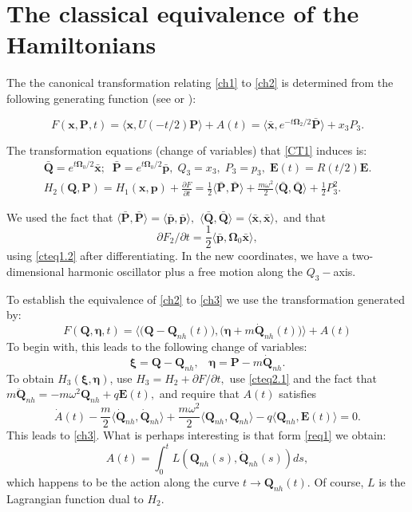\documentclass[12pt]{article}
\numberwithin{equation}{section}
\newcommand{\bxi}{{\boldsymbol \xi}}
\newcommand{\bet}{{\boldsymbol \eta}}
\newcommand{\bOm}{{\boldsymbol \Omega}}
\def\bp{{\boldsymbol p}}
\def\bP{{\boldsymbol P}}
\def\bE{{\boldsymbol E}}
\def\bQ{{\boldsymbol Q}}
\def\bx{{\boldsymbol x}}
\begin{document}
\section{The classical equivalence of the Hamiltonians}
The the canonical transformation relating \eqref{ch1} to \eqref{ch2} is determined from the following generating function (see \cite{A} or \cite{G}):

\begin{equation}\label{CT1}
F(\bx,\bP,t) = \langle\bx,U(-t/2)\bP\rangle + A(t) = \langle\bar{\bx},e^{-t\bOm_2/2}\bar{\bP}\rangle +x_3P_3.
\end{equation}	

The transformation equations (change of variables) that \eqref{CT1} induces is:
\begin{gather}
\bar{\bQ} = e^{t\bOm_0/2}\bar{\bx};\;\;\bar{\bP}=e^{t\bOm_0/2}\bar{\bp}, \;Q_3=x_3, \;P_3=p_3, \;\bE(t)=R(t/2)\bE. \label{cteq1.1} \\
H_2(\bQ,\bP)  = H_1(\bx,\bp) + \frac{\partial F}{\partial t} = \frac{1}{2}\langle\bar{\bP},\bar{\bP}\rangle+ \frac{m\omega^2}{2}\langle\bar{\bQ},\bar{\bQ}\rangle + \frac{1}{2}P_3^2. \label{cteq1.2}
\end{gather}
		 
We used the fact that 	$\langle\bar{\bP},\bar{\bP}\rangle=\langle\bar{\bp},\bar{\bp}\rangle,$ $\langle\bar{\bQ},\bar{\bQ}\rangle=\langle\bar{\bx},\bar{\bx}\rangle,$ and that 
$$\partial F_2/\partial t =\frac{1}{2} \langle\bar{\bp},\bOm_0\bar{\bx}\rangle,$$
using \eqref{cteq1.2} after differentiating. In the new coordinates, we have a two-dimensional harmonic oscillator plus a free motion along the $Q_3-$axis.

To establish the equivalence of \eqref{ch2} to \eqref{ch3} we use the transformation generated by:
\begin{equation}\label{CT2}
F(\bQ,\bet,t) = \langle\big(\bQ-\bQ_{nh}(t)\big),\big(\bet + m\dot{\bQ}_{nh}(t)\big)\rangle+A(t)
\end{equation}
To begin with, this leads to the following change of variables:
\begin{equation}\label{cteq2.1}
\bxi = \bQ - \bQ_{nh},\;\;\;\bet = \bP - m\dot{\bQ}_{nh}.
\end{equation}
To obtain $H_3(\bxi,\bet)$, use $H_3=H_2+\partial F/\partial t,$ use \eqref{cteq2.1} and the fact that $m\ddot{\bQ}_{nh}=-m\omega^2\bQ_{nh}+q\bE(t),$ and require that $A(t)$  satisfies
\begin{equation}\label{req1}
\dot{A}(t) -\frac{m}{2}\langle\dot{\bQ}_{nh},\dot{\bQ}_{nh}\rangle +\frac{m\omega^2}{2}\langle\bQ_{nh},\bQ_{nh}\rangle - q\langle\bQ_{nh},\bE(t)\rangle = 0.
\end{equation}
This leads to \eqref{ch3}. What is perhaps interesting is that form  \eqref{req1} we obtain:
\begin{equation}\label{act}
A(t) = \int_0^t L(\bQ_{nh}(s),\dot{\bQ}_{nh}(s))ds,
\end{equation}
which happens to be the action along the curve $t \to \bQ_{nh}(t).$ Of course, $L$ is the Lagrangian function dual to $H_2.$
\end{document}
